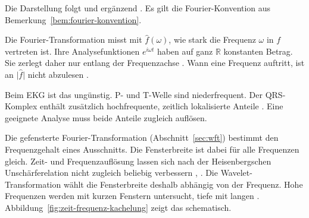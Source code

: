 \documentclass[a4paper,11pt,bibliography=totoc,listof=totoc,headinclude=true,cleardoublepage=empty,oneside]{scrbook}
\theoremstyle{plain}
\theoremstyle{definition}
\newcommand{\R}{\mathbb{R}}
\begin{document}
Die Darstellung folgt \cite[Kap.~3.1--3.3]{blatter} %
und ergänzend \cite[Kap.~1.1]{lmr}. %
Es gilt die Fourier-Konvention aus Bemerkung~\ref{bem:fourier-konvention}.
 
Die Fourier-Transformation misst mit $\hat f(\omega)$, wie stark die Frequenz
$\omega$ in $f$ vertreten ist. Ihre Analysefunktionen $e^{i\omega t}$ haben auf
ganz $\R$ konstanten Betrag. Sie zerlegt daher nur entlang der Frequenzachse
\cite[Bem.~1.3.4]{lmr}. %
Wann eine Frequenz auftritt, ist an $\lvert\hat f\rvert$ nicht abzulesen
\cite[Kap.~1.2--1.3]{blatter}. %
 
Beim EKG ist das ungünstig. P- und T-Welle sind niederfrequent. Der
QRS-Komplex enthält zusätzlich hochfrequente, zeitlich lokalisierte Anteile
\cite[Kap.~2.3]{rebstadt}. %
Eine geeignete Analyse muss beide Anteile zugleich auflösen.
 
Die gefensterte Fourier-Transformation (Abschnitt~\ref{sec:wft}) bestimmt den
Frequenzgehalt eines Ausschnitts. Die Fensterbreite ist dabei für alle
Frequenzen gleich. Zeit- und Frequenzauflösung lassen sich nach der
Heisenbergschen Unschärferelation nicht zugleich beliebig verbessern
\cite[Kap.~2.3]{blatter}, %
\cite[Kap.~1.3.1]{lmr}. %
Die Wavelet-Transformation wählt die Fensterbreite deshalb abhängig von der
Frequenz. Hohe Frequenzen werden mit kurzen Fenstern untersucht, tiefe mit
langen \cite[Kap.~1.3.2]{lmr}. %
Abbildung~\ref{fig:zeit-frequenz-kachelung} zeigt das schematisch.
 
\end{document}

